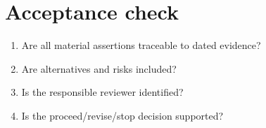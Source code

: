 \documentclass[11pt]{article}
\begin{document}
\section{Acceptance check}
\begin{enumerate}[leftmargin=*,itemsep=5pt]
\item Are all material assertions traceable to dated evidence?
\item Are alternatives and risks included?
\item Is the responsible reviewer identified?
\item Is the proceed/revise/stop decision supported?
\end{enumerate}
\end{document}
